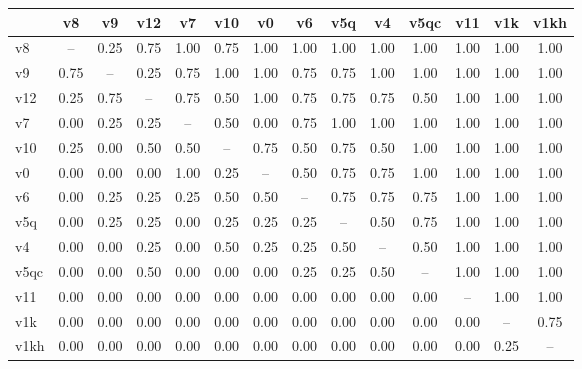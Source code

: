 \begin{tabular}{lccccccccccccc}
\toprule
 & v8 & v9 & v12 & v7 & v10 & v0 & v6 & v5q & v4 & v5qc & v11 & v1k & v1kh \\
\midrule
v8 & -- & 0.25 & 0.75 & 1.00 & 0.75 & 1.00 & 1.00 & 1.00 & 1.00 & 1.00 & 1.00 & 1.00 & 1.00 \\
v9 & 0.75 & -- & 0.25 & 0.75 & 1.00 & 1.00 & 0.75 & 0.75 & 1.00 & 1.00 & 1.00 & 1.00 & 1.00 \\
v12 & 0.25 & 0.75 & -- & 0.75 & 0.50 & 1.00 & 0.75 & 0.75 & 0.75 & 0.50 & 1.00 & 1.00 & 1.00 \\
v7 & 0.00 & 0.25 & 0.25 & -- & 0.50 & 0.00 & 0.75 & 1.00 & 1.00 & 1.00 & 1.00 & 1.00 & 1.00 \\
v10 & 0.25 & 0.00 & 0.50 & 0.50 & -- & 0.75 & 0.50 & 0.75 & 0.50 & 1.00 & 1.00 & 1.00 & 1.00 \\
v0 & 0.00 & 0.00 & 0.00 & 1.00 & 0.25 & -- & 0.50 & 0.75 & 0.75 & 1.00 & 1.00 & 1.00 & 1.00 \\
v6 & 0.00 & 0.25 & 0.25 & 0.25 & 0.50 & 0.50 & -- & 0.75 & 0.75 & 0.75 & 1.00 & 1.00 & 1.00 \\
v5q & 0.00 & 0.25 & 0.25 & 0.00 & 0.25 & 0.25 & 0.25 & -- & 0.50 & 0.75 & 1.00 & 1.00 & 1.00 \\
v4 & 0.00 & 0.00 & 0.25 & 0.00 & 0.50 & 0.25 & 0.25 & 0.50 & -- & 0.50 & 1.00 & 1.00 & 1.00 \\
v5qc & 0.00 & 0.00 & 0.50 & 0.00 & 0.00 & 0.00 & 0.25 & 0.25 & 0.50 & -- & 1.00 & 1.00 & 1.00 \\
v11 & 0.00 & 0.00 & 0.00 & 0.00 & 0.00 & 0.00 & 0.00 & 0.00 & 0.00 & 0.00 & -- & 1.00 & 1.00 \\
v1k & 0.00 & 0.00 & 0.00 & 0.00 & 0.00 & 0.00 & 0.00 & 0.00 & 0.00 & 0.00 & 0.00 & -- & 0.75 \\
v1kh & 0.00 & 0.00 & 0.00 & 0.00 & 0.00 & 0.00 & 0.00 & 0.00 & 0.00 & 0.00 & 0.00 & 0.25 & -- \\
\bottomrule
\end{tabular}
